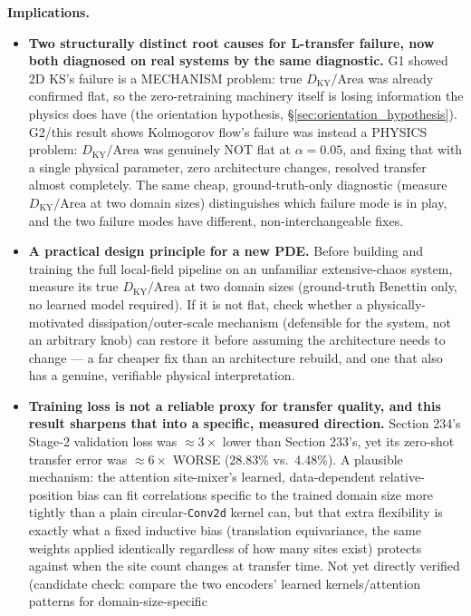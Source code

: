 \documentclass[11pt]{article}
\begin{document}
\textbf{Implications.}

\begin{itemize}[nosep]
\item \textbf{Two structurally distinct root causes for L-transfer
failure, now both diagnosed on real systems by the same diagnostic.} G1
showed 2D KS's failure is a MECHANISM problem: true
$D_{\mathrm{KY}}/\mathrm{Area}$ was already confirmed flat, so the
zero-retraining machinery itself is losing information the physics
does have (the orientation hypothesis, \S\ref{sec:orientation_hypothesis}).
G2/this result shows Kolmogorov flow's failure was instead a PHYSICS
problem: $D_{\mathrm{KY}}/\mathrm{Area}$ was genuinely NOT flat at
$\alpha=0.05$, and fixing that with a single physical parameter, zero
architecture changes, resolved transfer almost completely. The same
cheap, ground-truth-only diagnostic (measure $D_{\mathrm{KY}}/\mathrm{Area}$
at two domain sizes) distinguishes which failure mode is in play, and
the two failure modes have different, non-interchangeable fixes.
\item \textbf{A practical design principle for a new PDE.} Before
building and training the full local-field pipeline on an unfamiliar
extensive-chaos system, measure its true $D_{\mathrm{KY}}/\mathrm{Area}$
at two domain sizes (ground-truth Benettin only, no learned model
required). If it is not flat, check whether a physically-motivated
dissipation/outer-scale mechanism (defensible for the system, not an
arbitrary knob) can restore it before assuming the architecture needs to
change --- a far cheaper fix than an architecture rebuild, and one that
also has a genuine, verifiable physical interpretation.
\item \textbf{Training loss is not a reliable proxy for transfer
quality, and this result sharpens that into a specific, measured
direction.} Section 234's Stage-2 validation loss was $\approx3\times$
lower than Section 233's, yet its zero-shot transfer error was
$\approx6\times$ WORSE (28.83\% vs.\ 4.48\%). A plausible mechanism: the
attention site-mixer's learned, data-dependent relative-position bias
can fit correlations specific to the trained domain size more tightly
than a plain circular-\texttt{Conv2d} kernel can, but that extra
flexibility is exactly what a fixed inductive bias (translation
equivariance, the same weights applied identically regardless of how
many sites exist) protects against when the site count changes at
transfer time. Not yet directly verified (candidate check: compare the
two encoders' learned kernels/attention patterns for domain-size-specific

\end{itemize}
\end{document}
